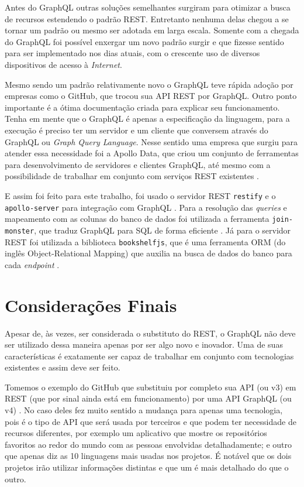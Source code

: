 Antes do GraphQL outras soluções semelhantes surgiram para otimizar a
busca de recursos estendendo o padrão REST. Entretanto nenhuma delas
chegou a se tornar um padrão ou mesmo ser adotada em larga escala.
Somente com a chegada do GraphQL foi possível enxergar um novo padrão
surgir e que fizesse sentido para ser implementado nos dias atuais, com
o crescente uso de diversos dispositivos de acesso à \emph{Internet}.

Mesmo sendo um padrão relativamente novo o GraphQL teve rápida adoção
por empresas como o GitHub, que trocou sua API REST por GraphQL. Outro
ponto importante é a ótima documentação criada para explicar seu
funcionamento. Tenha em mente que o GraphQL é apenas a especificação da
linguagem, para a execução é preciso ter um servidor e um cliente que
conversem através do GraphQL ou \emph{Graph Query Language}. Nesse
sentido uma empresa que surgiu para atender essa necessidade foi a
Apollo Data, que criou um conjunto de ferramentas para desenvolvimento
de servidores e clientes GraphQL, até mesmo com a possibilidade de
trabalhar em conjunto com serviços REST existentes
\cite{apollodata:2017}.

E assim foi feito para este trabalho, foi usado o servidor REST
\texttt{restify} \cite{restify:2017} e o \texttt{apollo-server} para
integração com GraphQL \cite{apollo-server:2017}. Para a resolução das
\emph{queries} e mapeamento com as colunas do banco de dados foi
utilizada a ferramenta \texttt{join-monster}, que traduz GraphQL para
SQL de forma eficiente \cite{join-monster:2017}. Já para o servidor REST
foi utilizada a biblioteca \texttt{bookshelfjs}, que é uma ferramenta
ORM (do inglês Object-Relational Mapping) que auxilia na busca de dados
do banco para cada \emph{endpoint} \cite{bookshelfjs:2017}.

\section{Considerações Finais}\label{considerauxe7uxf5es-finais}

Apesar de, às vezes, ser considerada o substituto do REST, o GraphQL não
deve ser utilizado dessa maneira apenas por ser algo novo e inovador.
Uma de suas características é exatamente ser capaz de trabalhar em
conjunto com tecnologias existentes e assim deve ser feito.

Tomemos o exemplo do GitHub que substituiu por completo sua API (ou v3)
em REST (que por sinal ainda está em funcionamento)
\cite{github-rest:2017} por uma API GraphQL (ou v4)
\cite{github-graphql:2017}. No caso deles fez muito sentido a mudança
para apenas uma tecnologia, pois é o tipo de API que será usada por
terceiros e que podem ter necessidade de recursos diferentes, por
exemplo um aplicativo que mostre os repositórios favoritos ao redor do
mundo com as pessoas envolvidas detalhadamente; e outro que apenas diz
as 10 linguagens mais usadas nos projetos. É notável que os dois
projetos irão utilizar informações distintas e que um é mais detalhado
do que o outro.

